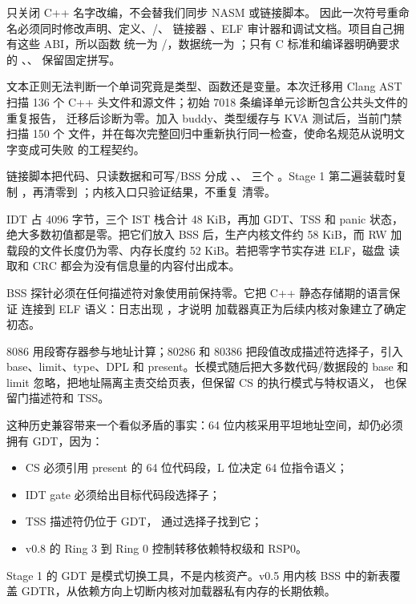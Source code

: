 只关闭 C++ 名字改编，不会替我们同步 NASM 或链接脚本。
因此一次符号重命名必须同时修改声明、定义、/、
链接器 、ELF 审计器和调试文档。项目自己拥有这些 ABI，所以函数
统一为 /，数据统一为
；只有 C 标准和编译器明确要求的
、、 保留固定拼写。

文本正则无法判断一个单词究竟是类型、函数还是变量。本次迁移用 Clang AST 扫描
136 个 C++ 头文件和源文件；初始 7018 条编译单元诊断包含公共头文件的重复报告，
迁移后诊断为零。加入 buddy、类型缓存与 KVA 测试后，当前门禁扫描 150 个
文件，并在每次完整回归中重新执行同一检查，使命名规范从说明文字变成可失败
的工程契约。

链接脚本把代码、只读数据和可写/BSS 分成 、、
 三个 。Stage 1 第二遍装载时复制
，再清零到 ；内核入口只验证结果，不重复
清零。

IDT 占 4096 字节，三个 IST 栈合计 48 KiB，再加 GDT、TSS 和 panic 状态，
绝大多数初值都是零。把它们放入 BSS 后，生产内核文件约 58 KiB，而 RW
加载段的文件长度仍为零、内存长度约 52 KiB。若把零字节实存进 ELF，磁盘
读取和 CRC 都会为没有信息量的内容付出成本。

BSS 探针必须在任何描述符对象使用前保持零。它把 C++ 静态存储期的语言保证
连接到 ELF  语义：日志出现 ，才说明
加载器真正为后续内核对象建立了确定初态。

8086 用段寄存器参与地址计算；80286 和 80386 把段值改成描述符选择子，引入
base、limit、type、DPL 和 present。长模式随后把大多数代码/数据段的 base
和 limit 忽略，把地址隔离主责交给页表，但保留 CS 的执行模式与特权语义，
也保留门描述符和 TSS。

这种历史兼容带来一个看似矛盾的事实：64 位内核采用平坦地址空间，却仍必须
拥有 GDT，因为：

\begin{itemize}
  \item CS 必须引用 present 的 64 位代码段，L 位决定 64 位指令语义；
  \item IDT gate 必须给出目标代码段选择子；
  \item TSS 描述符仍位于 GDT， 通过选择子找到它；
  \item v0.8 的 Ring 3 到 Ring 0 控制转移依赖特权级和 RSP0。
\end{itemize}

Stage 1 的 GDT 是模式切换工具，不是内核资产。v0.5 用内核 BSS 中的新表覆盖
GDTR，从依赖方向上切断内核对加载器私有内存的长期依赖。

